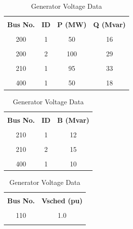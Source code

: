 \documentclass[paper=a4, fontsize=11pt]{article}
\begin{document}
\begin{table}[!htb]
	\begin{minipage}{.4\linewidth}
		\caption{Load Data}
		\centering
		\begin{tabular}{|c|c|c|c|}
		\hline &&&\\[-1em]
		\textbf{Bus No.} & \textbf{ID} & \textbf{P (MW)} & \textbf{Q (Mvar)} \\ \hline &&&\\[-1em]
		200              & 1           & 50              & 16                \\ \hline &&&\\[-1em]
		200              & 2           & 100             & 29                \\ \hline &&&\\[-1em]
		210              & 1           & 95              & 33                \\ \hline &&&\\[-1em]
		400              & 1           & 50              & 18                \\ \hline
		\end{tabular}
	\end{minipage}%
	\begin{minipage}{.3\linewidth}
		\caption{Capacitor Data}
		\centering
		\begin{tabular}{|c|c|c|}
		\hline &&\\[-1em]
		\textbf{Bus No.} & \textbf{ID} & \textbf{B (Mvar)} \\ \hline &&\\[-1em]
		210              & 1           & 12               \\ \hline &&\\[-1em]
		210              & 2           & 15               \\ \hline &&\\[-1em]
		400              & 1           & 10               \\ \hline
		\end{tabular}
	\end{minipage}%
	\begin{minipage}{.3\linewidth}
		\caption{Generator Voltage Data}
		\centering
		\begin{tabular}{|c|c|}
		\hline &\\[-1em]
		\textbf{Bus No.} & \textbf{Vsched (pu)} \\ \hline &\\[-1em]
		110              & 1.0                  \\ \hline &\\[-1em]

\end{tabular}
\end{minipage}
\end{table}
\end{document}
